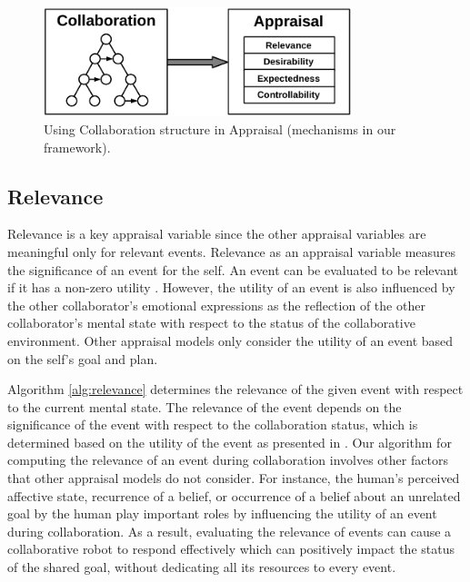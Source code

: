 \documentclass[12pt]{report}
\begin{document}
\begin{figure}[t]
  \centering
  \includegraphics[width=0.8\textwidth]{figure/appraisal-collaboration-croped.pdf}
  \caption{Using Collaboration structure in Appraisal (mechanisms in our
  framework).}
  \label{fig:appraisal-collaboration}
\end{figure}

\subsection{Relevance}
\label{sec:relevance}
Relevance is a key appraisal variable since the other appraisal variables
are meaningful only for relevant events. Relevance as an appraisal variable
measures the significance of an event for the self. An event can be evaluated to
be relevant if it has a non-zero utility \cite{marsella:ema-process-model}.
However, the utility of an event is also influenced by the other collaborator's
emotional expressions as the reflection of the other collaborator's mental state
with respect to the status of the collaborative environment. Other appraisal
models only consider the utility of an event based on the self's goal and plan.

Algorithm \ref{alg:relevance} determines the relevance of the given event with
respect to the current mental state. The relevance of the event depends on the
significance of the event with respect to the collaboration status, which is
determined based on the utility of the event as presented in
\cite{gratch:domain-independent,marsella:ema-process-model}. Our algorithm for
computing the relevance of an event during collaboration involves other factors
that other appraisal models do not consider. For instance, the human's
perceived affective state, recurrence of a belief, or occurrence of a belief about an
unrelated goal by the human play important roles by influencing the utility
of an event during collaboration. As a result, evaluating the relevance of
events can cause a collaborative robot to respond effectively which can
positively impact the status of the shared goal, without dedicating all its
resources to every event.
\end{document}
